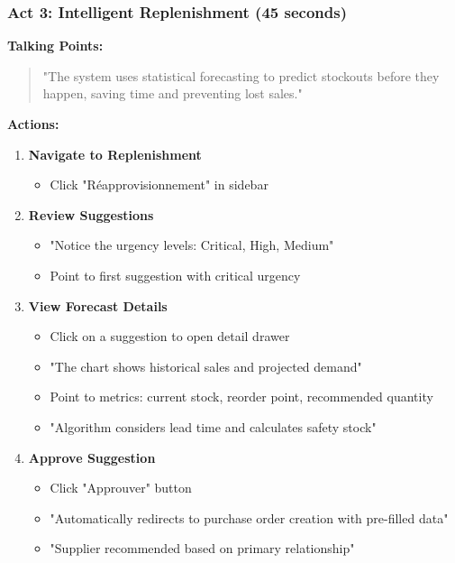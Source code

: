 \subsubsection{Act 3: Intelligent Replenishment (45 seconds)}

\textbf{Talking Points:}

\begin{quote}
"The system uses statistical forecasting to predict stockouts before they happen, saving time and preventing lost sales."
\end{quote}

\textbf{Actions:}

\begin{enumerate}
    \item \textbf{Navigate to Replenishment}
    \begin{itemize}
        \item Click "Réapprovisionnement" in sidebar
    \end{itemize}
    
    \item \textbf{Review Suggestions}
    \begin{itemize}
        \item "Notice the urgency levels: Critical, High, Medium"
        \item Point to first suggestion with critical urgency
    \end{itemize}
    
    \item \textbf{View Forecast Details}
    \begin{itemize}
        \item Click on a suggestion to open detail drawer
        \item "The chart shows historical sales and projected demand"
        \item Point to metrics: current stock, reorder point, recommended quantity
        \item "Algorithm considers lead time and calculates safety stock"
    \end{itemize}
    
    \item \textbf{Approve Suggestion}
    \begin{itemize}
        \item Click "Approuver" button
        \item "Automatically redirects to purchase order creation with pre-filled data"
        \item "Supplier recommended based on primary relationship"
    \end{itemize}
\end{enumerate}

